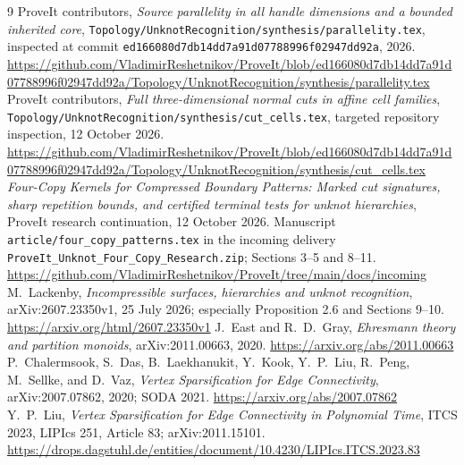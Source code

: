 \documentclass[11pt]{article}
\theoremstyle{remark}\newtheorem{remark}[theorem]{Remark}
\DeclareRobustCommand{\code}[1]{\nolinkurl{#1}}
\begin{document}
\begin{thebibliography}{9}
ProveIt contributors, \emph{Source parallelity in all handle dimensions and a bounded inherited core}, \code{Topology/UnknotRecognition/synthesis/parallelity.tex}, inspected at commit \code{ed166080d7db14dd7a91d07788996f02947dd92a}, 2026.\newline
\url{https://github.com/VladimirReshetnikov/ProveIt/blob/ed166080d7db14dd7a91d07788996f02947dd92a/Topology/UnknotRecognition/synthesis/parallelity.tex}
ProveIt contributors, \emph{Full three-dimensional normal cuts in affine cell families}, \code{Topology/UnknotRecognition/synthesis/cut_cells.tex}, targeted repository inspection, 12 October 2026.\newline
\url{https://github.com/VladimirReshetnikov/ProveIt/blob/ed166080d7db14dd7a91d07788996f02947dd92a/Topology/UnknotRecognition/synthesis/cut_cells.tex}
\emph{Four-Copy Kernels for Compressed Boundary Patterns: Marked cut signatures, sharp repetition bounds, and certified terminal tests for unknot hierarchies}, ProveIt research continuation, 12 October 2026. Manuscript \code{article/four_copy_patterns.tex} in the incoming delivery \code{ProveIt_Unknot_Four_Copy_Research.zip}; Sections 3--5 and 8--11.\newline
\url{https://github.com/VladimirReshetnikov/ProveIt/tree/main/docs/incoming}
M.~Lackenby, \emph{Incompressible surfaces, hierarchies and unknot recognition}, arXiv:2607.23350v1, 25 July 2026; especially Proposition 2.6 and Sections 9--10.\newline
\url{https://arxiv.org/html/2607.23350v1}
J.~East and R.~D.~Gray, \emph{Ehresmann theory and partition monoids}, arXiv:2011.00663, 2020.\newline
\url{https://arxiv.org/abs/2011.00663}
P.~Chalermsook, S.~Das, B.~Laekhanukit, Y.~Kook, Y.~P.~Liu, R.~Peng, M.~Sellke, and D.~Vaz, \emph{Vertex Sparsification for Edge Connectivity}, arXiv:2007.07862, 2020; SODA 2021.\newline
\url{https://arxiv.org/abs/2007.07862}
Y.~P.~Liu, \emph{Vertex Sparsification for Edge Connectivity in Polynomial Time}, ITCS 2023, LIPIcs 251, Article 83; arXiv:2011.15101.\newline
\url{https://drops.dagstuhl.de/entities/document/10.4230/LIPIcs.ITCS.2023.83}
\end{thebibliography}
\end{document}

